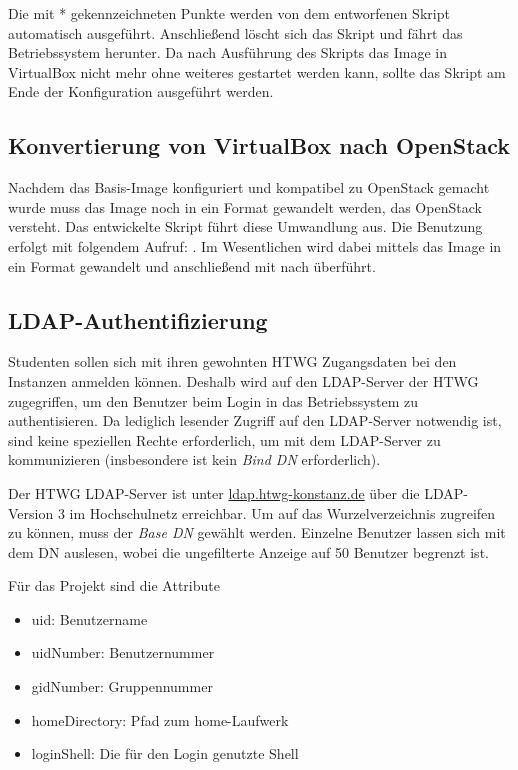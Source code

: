 Die mit * gekennzeichneten Punkte werden von dem entworfenen Skript  automatisch ausgeführt. 
Anschließend löscht sich das Skript und fährt das Betriebssystem herunter.
Da nach Ausführung des  Skripts das Image in VirtualBox nicht mehr ohne weiteres gestartet werden kann, sollte das Skript am Ende der Konfiguration ausgeführt werden.

\subsection{Konvertierung von VirtualBox nach OpenStack}

Nachdem das Basis-Image konfiguriert und kompatibel zu OpenStack gemacht wurde muss das Image noch in ein Format gewandelt werden, das OpenStack versteht.
Das entwickelte Skript  führt diese Umwandlung aus. 
Die Benutzung erfolgt mit folgendem Aufruf: .
Im Wesentlichen wird dabei mittels  das Image in ein  Format gewandelt und anschließend mit  nach  überführt.

\subsection{LDAP-Authentifizierung}\label{ldap_auth2}

Studenten sollen sich mit ihren gewohnten HTWG Zugangsdaten bei den Instanzen anmelden können. 
Deshalb wird auf den LDAP-Server der HTWG zugegriffen, um den Benutzer beim Login in das Betriebssystem zu authentisieren. 
Da lediglich lesender Zugriff auf den LDAP-Server notwendig ist, sind keine speziellen Rechte erforderlich, um  mit dem LDAP-Server zu kommunizieren (insbesondere ist kein \emph{Bind DN} erforderlich).

Der HTWG LDAP-Server ist unter \url{ldap.htwg-konstanz.de} über die LDAP-Version 3 im Hochschulnetz erreichbar. 
Um auf das Wurzelverzeichnis zugreifen zu können, muss der \emph{Base DN}  gewählt werden. 
Einzelne Benutzer lassen sich mit dem DN  auslesen, wobei die ungefilterte Anzeige auf 50 Benutzer begrenzt ist. 

Für das Projekt sind die Attribute

\begin{itemize}
\item uid: Benutzername
\item uidNumber: Benutzernummer
\item gidNumber: Gruppennummer
\item homeDirectory: Pfad zum home-Laufwerk
\item loginShell: Die für den Login genutzte Shell
\end{itemize}

